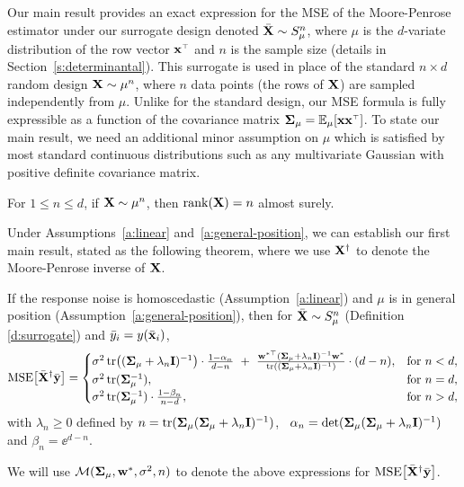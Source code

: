\documentclass[11pt]{article}
\begin{document}
\noindent
Our main result provides an exact expression for the MSE of the
Moore-Penrose estimator under our surrogate design denoted ${\bar{\mathbf X}}\sim S_\mu^n$, where
$\mu$ is the $d$-variate distribution of the row vector $\x^\top$ and $n$ is the sample
size (details in Section~\ref{s:determinantal}). This surrogate is
used in place of the standard $n\times d$ random design $\mathbf X\sim\mu^n$, where $n$
data points (the rows of $\mathbf X$) are sampled independently from
$\mu$. Unlike for the standard design, our MSE formula is
fully expressible as a function of the covariance
matrix $\Sigmab_\mu=\E_\mu[\x\x^\top]$. To state our main result, we
need an additional minor assumption on $\mu$ which is satisfied by
most standard continuous distributions such as any multivariate
Gaussian with positive definite covariance matrix.
\begin{assumption}\label{a:general-position}
For $1\leq n \leq d$, if $\mathbf X\sim\mu^n$, then $\mathrm{rank}(\mathbf X)=n$ almost surely.
\end{assumption}

\noindent
Under Assumptions~\ref{a:linear} and~\ref{a:general-position}, we can
establish our first main result, stated as the following theorem, where
we use $\mathbf X^\dagger$ to denote the Moore-Penrose inverse of $\mathbf X$.

\begin{theorem}
\label{t:mse}
  If the response noise is homoscedastic %
  (Assumption~\ref{a:linear}) and $\mu$ is in
  general position (Assumption~\ref{a:general-position}), then for
  ${\bar{\mathbf X}}\sim S_\mu^n$ (Definition \ref{d:surrogate}) and
  ${\bar y}_i=y(\bar{\mathbf x}_i)$, %
  \begin{align*}
    \MSE{\Xb^\dagger\ybb} =
    \begin{cases}
    \sigma^2\,\tr\big((\Sigmab_\mu+\lambda_n\I)^{-1}\big)\cdot
    \frac{1-\alpha_n}{d-n}\ +\
\frac{\w^{*\top}(\Sigmab_\mu+\lambda_n\I)^{-1}\w^*}
{\tr((\Sigmab_\mu+\lambda_n\I)^{-1})}\cdot (d-n),
&\text{for }n<d,\\
\sigma^2\, \tr(\Sigmab_\mu^{-1}),& \text{for }n=d,\\
\sigma^2\,\tr(\Sigmab_\mu^{-1})\cdot\frac{1-\beta_n}{n-d},&\text{for
}n>d,
\end{cases}
  \end{align*}
with $\lambda_n\geq 0$ defined by
  $n=\mathrm{tr}(\mathbf{\Sigma}_\mu (\mathbf{\Sigma}_\mu+\lambda_n\mathbf I)^{-1})$, \
  $\alpha_n=\det(\mathbf{\Sigma}_\mu(\mathbf{\Sigma}_\mu+\lambda_n\mathbf I)^{-1})$
  and $\beta_n=\ee^{d-n}$.
\end{theorem}
\begin{definition}
  We will use $\mathcal M(\mathbf{\Sigma}_\mu, \mathbf w^*,\sigma^2,n)$ to denote the above expressions
  for ${\mathrm{MSE}\big[{\bar{\mathbf X}}^\dagger\bar{\mathbf y}\big]}$.
\end{definition}
\end{document}
